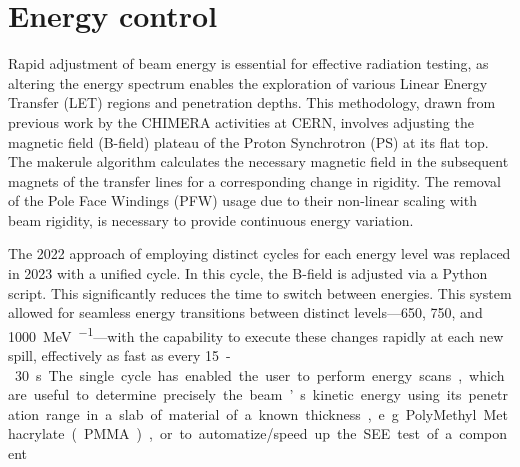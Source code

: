 \documentclass[a4paper,
               biblatex,     %
               ]{jacow}
\begin{document}













\section{Energy control}

Rapid adjustment of beam energy is essential for effective radiation testing, as altering the energy spectrum enables the exploration of various Linear Energy Transfer (LET) regions and penetration depths. This methodology, drawn from previous work by the CHIMERA activities at CERN, involves adjusting the magnetic field (B-field) plateau of the Proton Synchrotron (PS) at its flat top. The makerule algorithm calculates the necessary magnetic field in the subsequent magnets of the transfer lines for a corresponding change in rigidity. The removal of the Pole Face Windings (PFW) usage due to their non-linear scaling with beam rigidity, is necessary to provide continuous energy variation.

The 2022 approach of employing distinct cycles for each energy level was replaced in 2023 with a unified cycle. In this cycle, the B-field is adjusted via a Python script. This significantly reduces the time to switch between energies. This system allowed for seamless energy transitions between distinct levels—\SI{650}{}, \SI{750}{}, and \SI{1000}{\mega\electronvolt\per\nucleon}—with the capability to execute these changes rapidly at each new spill, effectively as fast as every \SI{15}-\SI{30}{\second}.

The single cycle has enabled the user to perform energy scans, which are useful to determine precisely the beam’s kinetic energy using its penetration range in a slab of material of a known thickness, e.g. PolyMethyl Methacrylate (PMMA), or to automatize/speed up the SEE test of a component. \cite{noauthor_hearts_nodate}
\end{document}
